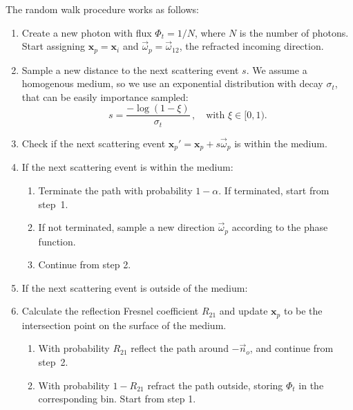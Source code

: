 \documentclass[10pt,a4paper]{article}
\newcommand{\x}{\mathbf{x}}
\newcommand{\vomega}{\vec{\omega}}
\begin{document}
The random walk procedure works as follows:
%
\begin{enumerate}

\item Create a new photon with flux $\Phi_t = 1 / N$, where $N$ is the number of photons. Start assigning $\x_p = \x_i$ and $\vomega_p = \vomega_{12}$, the refracted incoming direction.

\item Sample a new distance to the next scattering event $s$. We assume a homogenous medium, so we use an exponential distribution with decay $\sigma_t$, that can be easily importance sampled:
%
\[
s = \frac{-\log(1 -\xi)}{\sigma_t} \, , \quad \textrm{with $\xi \in [0,1)$.}
\]

\item Check if the next scattering event $\x_p' = \x_p + s \vomega_p $ is within the medium.

\item If the next scattering event is within the medium:

\begin{enumerate}

\item Terminate the path with probability $1-\alpha$. If terminated, start from step~1.

\item If not terminated, sample a new direction $\vomega_p$ according to the phase function.

\item Continue from step 2.

\end{enumerate}

\item If the next scattering event is outside of the medium:

\item Calculate the reflection Fresnel coefficient $R_{21}$ and update $\x_p$ to be the intersection point on the surface of the medium.

\begin{enumerate}

\item With probability $R_{21}$ reflect the path around $-\vec{n}_o$, and continue from step~2.

\item With probability $1 - R_{21}$ refract the path outside, storing $\Phi_t$ in the corresponding bin. Start from step 1.

\end{enumerate}

\end{enumerate}
\end{document}
